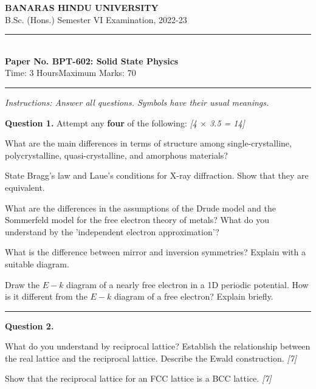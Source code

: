 \documentclass[11pt,a4paper]{article}
\newcommand{\pts}[1]{\hfill   \textit{[#1]}}
\begin{document}
\begin{center}
  {\large\bfseries BANARAS HINDU UNIVERSITY}\\[2pt]
  {\normalsize B.Sc. (Hons.) Semester VI Examination, 2022-23}\\[6pt]
  \rule{0.8\linewidth}{0.5pt}\\[6pt]
  {\large\bfseries Paper No. BPT-602: Solid State Physics}\\[4pt]
  {\normalsize Time: 3 Hours\hfill Maximum Marks: 70}
\end{center}
\rule{\linewidth}{0.4pt}
\smallskip



\noindent   \textit{Instructions: Answer all questions. Symbols have their usual meanings.}
\bigskip




\noindent   \textbf{Question 1.} Attempt any   \textbf{four} of the following: \pts{4 $ \times$ 3.5 = 14}

\begin{parts}
  \item What are the main differences in terms of structure among single-crystalline, polycrystalline, quasi-crystalline, and amorphous materials?
  \item State Bragg's law and Laue's conditions for X-ray diffraction. Show that they are equivalent.
  \item What are the differences in the assumptions of the Drude model and the Sommerfeld model for the free electron theory of metals? What do you understand by the 'independent electron approximation'?
  \item What is the difference between mirror and inversion symmetries? Explain with a suitable diagram.
  \item Draw the $E-k$ diagram of a nearly free electron in a 1D periodic potential. How is it different from the $E-k$ diagram of a free electron? Explain briefly.
\end{parts}

\medskip\rule{\linewidth}{0.2pt}




\noindent   \textbf{Question 2.}

\begin{parts}
  \item What do you understand by reciprocal lattice? Establish the relationship between the real lattice and the reciprocal lattice. Describe the Ewald construction. \pts{7}
  \item Show that the reciprocal lattice for an FCC lattice is a BCC lattice. \pts{7}
\end{parts}
\end{document}
